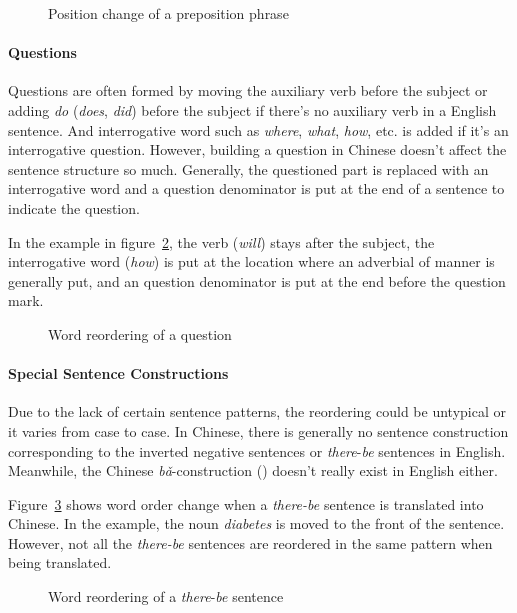 \begin{figure}[H]
\centering

\caption{Position change of a preposition phrase}
\label{g3}
\end{figure}

\paragraph{Questions}
Questions are often formed by moving the auxiliary verb before the subject or adding \emph{do} (\emph{does}, \emph{did}) before the subject if there's no auxiliary verb in a English sentence. And interrogative word such as \emph{where}, \emph{what}, \emph{how}, etc. is added if it's an interrogative question. However, building a question in Chinese doesn't affect the sentence structure so much. Generally, the questioned part is replaced with an interrogative word and a question denominator is put at the end of a sentence to indicate the question. 

In the example in figure~\ref{question}, the verb  (\textit{will}) stays after the subject, the interrogative word  (\textit{how}) is put at the location where an adverbial of manner is generally put, and an question denominator  is put at the end before the question mark.

\begin{figure}[H]
\centering

\caption{Word reordering of a question}
\label{question}
\end{figure}

\paragraph{Special Sentence Constructions}
Due to the lack of certain sentence patterns, the reordering could be untypical or it varies from case to case. In Chinese, there is generally no sentence construction corresponding to the inverted negative sentences or \emph{there}-\emph{be} sentences in English. Meanwhile, the Chinese \emph{bǎ}-construction () doesn't really exist in English either. 

Figure~\ref{g5} shows word order change when a \emph{there-be} sentence is translated into Chinese. In the example, the noun \emph{diabetes} is moved to the front of the sentence. However, not all the \emph{there-be} sentences are reordered in the same pattern when being translated.

\begin{figure}[H]
\centering

\caption{Word reordering of a \emph{there}-\emph{be} sentence}
\label{g5}
\end{figure}

